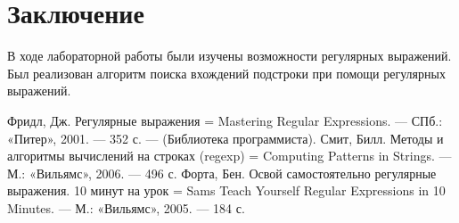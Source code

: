 \documentclass[12pt]{report}
\begin{document}
\chapter*{Заключение}
В ходе лабораторной работы были изучены возможности регулярных выражений. Был реализован алгоритм поиска вхождений подстроки при помощи регулярных выражений.


\begin{thebibliography}{3}
	Фридл, Дж. Регулярные выражения = Mastering Regular Expressions. — СПб.: «Питер», 2001. — 352 с. — (Библиотека программиста). 	
	Смит, Билл. Методы и алгоритмы вычислений на строках (regexp) = Computing Patterns in Strings. — М.: «Вильямс», 2006. — 496 с.
	Форта, Бен. Освой самостоятельно регулярные выражения. 10 минут на урок = Sams Teach Yourself Regular Expressions in 10 Minutes. — М.: «Вильямс», 2005. — 184 с.
\end{thebibliography}
\end{document}
